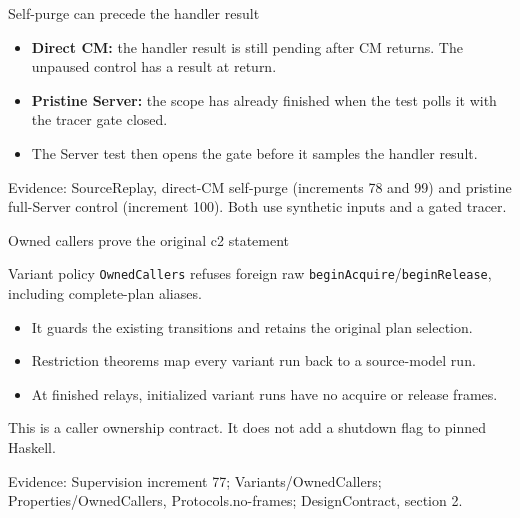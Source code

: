 \documentclass[11pt,aspectratio=169]{beamer}
\newcommand{\evidence}[1]{\vfill{\fontsize{7}{8}\selectfont\color{Muted}Evidence: #1\par}}
\begin{document}
\begin{frame}{Self-purge can precede the handler result}
\centering
{}
\par\vspace{4mm}
\begin{itemize}\setlength\itemsep{2.5mm}
\item \textbf{Direct CM:} the handler result is still pending after CM returns. The unpaused control has a result at return.
\item \textbf{Pristine Server:} the scope has already finished when the test polls it with the tracer gate closed.
\item The Server test then opens the gate before it samples the handler result.
\end{itemize}
\evidence{SourceReplay, direct-CM self-purge (increments 78 and 99) and pristine full-Server control (increment 100). Both use synthetic inputs and a gated tracer.}
\end{frame}

\begin{frame}{Owned callers prove the original c2 statement}
\begin{block}{Variant policy}
\texttt{OwnedCallers} refuses foreign raw \texttt{beginAcquire}/\texttt{beginRelease}, including complete-plan aliases.
\end{block}\begin{itemize}\setlength\itemsep{2.5mm}
\item It guards the existing transitions and retains the original plan selection.
\item Restriction theorems map every variant run back to a source-model run.
\item At finished relays, initialized variant runs have no acquire or release frames.
\end{itemize}\small This is a caller ownership contract. It does not add a shutdown flag to pinned Haskell.
\evidence{Supervision increment 77; Variants/OwnedCallers; Properties/OwnedCallers, Protocols.no-frames; DesignContract, section 2.}
\end{frame}
\end{document}
